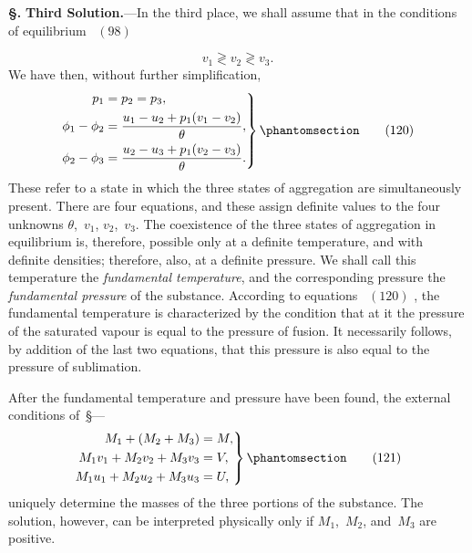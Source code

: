 \documentclass[12pt]{book}[2005/09/16]
\newcommand{\Chg}[2]{#2}
\newcommand{\Add}[1]{\Chg{}{#1}}
\newcommand{\Section}[1]{
  \medskip\par\textbf{§\;#1}
  \label{section:#1}
}
\newcommand{\SecRef}[2][§\;]{\hyperref[section:#2.]{{\upshape #1#2}}}
\newcommand{\Tag}[1]{%
  \phantomsection\label{eqn:#1}\tag*{\ensuremath{#1}}%
}
\newcommand{\Eq}[1]{%
  \hyperref[eqn:#1]{\ensuremath{#1}}%
}
\newcommand{\PageSep}[1]{\ignorespaces}
\newcommand{\Topic}[1]{\textbf{#1}}
\begin{document}
\Section{186.} \Topic{Third Solution.}---In the third place, we shall
assume that in the conditions of equilibrium~\Eq{(98)}
\[
v_{1} \gtrless v_{2} \gtrless v_{3}.
\]
We have then, without further simplification,
\[
\left.
\begin{aligned}
p_{1} &= p_{2} = p_{3}\Add{,} \\
\phi_{1} - \phi_{2} &= \frac{u_{1} - u_{2} + p_{1}(v_{1} - v_{2})}{\theta}\Add{,} \\
\phi_{2} - \phi_{3} &= \frac{u_{2} - u_{3} + p_{1}(v_{2} - v_{3})}{\theta}\Add{.}
\end{aligned}
\right\}
\Tag{(120)}
\]
These refer to a state in which the three states of aggregation
%
%
%
are simultaneously present. There are four equations,
and these assign definite values to the four unknowns $\theta$,~$v_{1}$,
$v_{2}$,~$v_{3}$. The coexistence of the three states of aggregation in
equilibrium is, therefore, possible only at a definite temperature,
and with definite densities; therefore, also, at a
\PageSep{154}
%
%
%
definite pressure. We shall call this temperature the
%
%
%
\emph{fundamental temperature}, and the corresponding pressure
the \emph{fundamental pressure} of the substance. According to
equations~\Eq{(120)}, the fundamental temperature is characterized
by the condition that at it the pressure of the saturated
vapour is equal to the pressure of fusion. It necessarily
follows, by addition of the last two equations, that this
pressure is also equal to the pressure of sublimation.

After the fundamental temperature and pressure have
been found, the external conditions of~\SecRef{166}---
\[
\left.
\begin{aligned}
M_{1} + (M_{2} + M_{3}) &= M\Add{,} \\
M_{1} v_{1} + M_{2} v_{2} + M_{3} v_{3} &= V\Add{,} \\
M_{1} u_{1} + M_{2} u_{2} + M_{3} u_{3} &= U\Add{,} \\
\end{aligned}
\right\}
\Tag{(121)}
\]
uniquely determine the masses of the three portions of
the substance. The solution, however, can be interpreted
physically only if $M_{1}$,~$M_{2}$, and~$M_{3}$ are positive.
\end{document}
